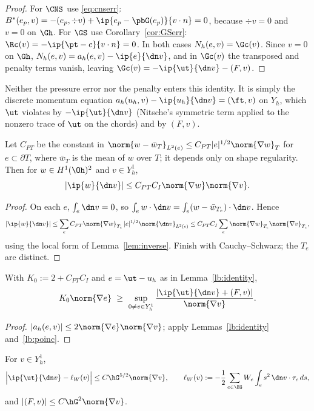 \begin{proof}
For $\CNS$ use \eqref{eq:cnserr}: $B^\ast(e_p,v)=-(e_p,\div v)+\ip{e_p-\pbG(e_p)}{v\cdot n}=0$, because $\div v=0$ and $v=0$ on $\Gh$. For $\GS$ use Corollary~\ref{cor:GSerr}: $\Rc(v)=-\ip{\pt-c}{v\cdot n}=0$. In both cases $N_h(e,v)=\Gc(v)$. Since $v=0$ on $\Gh$, $N_h(e,v)=a_h(e,v)-\ip{e}{\dn v}$, and in $\Gc(v)$ the transposed and penalty terms vanish, leaving $\Gc(v)=-\ip{\ut}{\dn v}-(F,v)$.
\end{proof}

Neither the pressure error nor the penalty enters this identity. It is simply the discrete momentum equation $a_h(u_h,v)-\ip{u_h}{\dn v}=(\ft,v)$ on $Y_h$, which $\ut$ violates by $-\ip{\ut}{\dn v}$ (Nitsche's symmetric term applied to the nonzero trace of $\ut$ on the chords) and by $(F,v)$.

\begin{lemma}\label{lb:poinc}
Let $C_{PT}$ be the constant in $\norm{w-\bar w_T}_{L^2(e)}\le C_{PT}|e|^{1/2}\norm{\nabla w}_{T}$ for $e\subset\partial T$, where $\bar w_T$ is the mean of $w$ over $T$; it depends only on shape regularity. Then for $w\in H^1(\Oh)^2$ and $v\in Y_h^1$,
\[
|\ip{w}{\dn v}|\le C_{PT}C_I\norm{\nabla w}\norm{\nabla v}.
\]
\end{lemma}

\begin{proof}
On each $e$, $\int_e\dn v=0$, so $\int_e w\cdot\dn v=\int_e(w-\bar w_{T_e})\cdot\dn v$. Hence
\[
|\ip{w}{\dn v}|\le\sum_e C_{PT}\norm{\nabla w}_{T_e}\,|e|^{1/2}\norm{\dn v}_{L^2(e)}\le C_{PT}C_I\sum_e\norm{\nabla w}_{T_e}\norm{\nabla v}_{T_e},
\]
using the local form of Lemma~\ref{lem:inverse}. Finish with Cauchy--Schwarz; the $T_e$ are distinct.
\end{proof}

\begin{corollary}\label{lb:abstract}
With $K_0:=2+C_{PT}C_I$ and $e=\ut-u_h$ as in Lemma~\ref{lb:identity},
\[
K_0\norm{\nabla e}\ \ge\ \sup_{0\ne v\in Y_h^1}\frac{|\ip{\ut}{\dn v}+(F,v)|}{\norm{\nabla v}} .
\]
\end{corollary}

\begin{proof}
$|a_h(e,v)|\le2\norm{\nabla e}\norm{\nabla v}$; apply Lemmas~\ref{lb:identity} and~\ref{lb:poinc}.
\end{proof}

\begin{lemma}\label{lb:expand}
For $v\in Y_h^1$,
\[
\Bigl|\ip{\ut}{\dn v}-\ell_W(v)\Bigr|\le C\hG^{5/2}\norm{\nabla v},\qquad \ell_W(v):=-\frac12\sum_{e\in\EG}W_e\int_e s^2\,\dn v\cdot\tau_e\,ds,
\]
and $|(F,v)|\le C\hG^2\norm{\nabla v}$.
\end{lemma}

